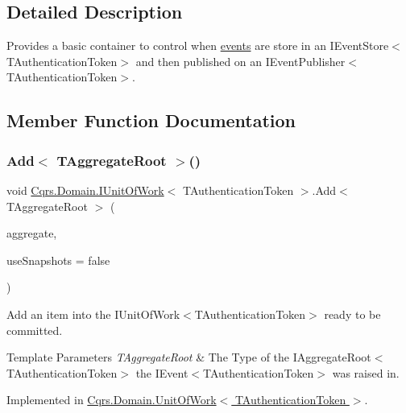 \subsection{Detailed Description}
Provides a basic container to control when \hyperlink{}{events} are store in an I\+Event\+Store$<$\+T\+Authentication\+Token$>$ and then published on an I\+Event\+Publisher$<$\+T\+Authentication\+Token$>$. 



\subsection{Member Function Documentation}
\mbox{\label{interfaceCqrs_1_1Domain_1_1IUnitOfWork_a1899165061529d5c9e77429b1fa72189_a1899165061529d5c9e77429b1fa72189}} 
\subsubsection{\texorpdfstring{Add$<$ T\+Aggregate\+Root $>$()}{Add< TAggregateRoot >()}}
{\footnotesize\ttfamily void \hyperlink{interfaceCqrs_1_1Domain_1_1IUnitOfWork}{Cqrs.\+Domain.\+I\+Unit\+Of\+Work}$<$ T\+Authentication\+Token $>$.Add$<$ T\+Aggregate\+Root $>$ (\begin{DoxyParamCaption}\item[{T\+Aggregate\+Root}]{aggregate,  }\item[{bool}]{use\+Snapshots = {\ttfamily false} }\end{DoxyParamCaption})}



Add an item into the I\+Unit\+Of\+Work$<$\+T\+Authentication\+Token$>$ ready to be committed. 


\begin{DoxyTemplParams}{Template Parameters}
{\em T\+Aggregate\+Root} & The Type of the I\+Aggregate\+Root$<$\+T\+Authentication\+Token$>$ the I\+Event$<$\+T\+Authentication\+Token$>$ was raised in.\\
\hline
\end{DoxyTemplParams}


Implemented in \hyperlink{classCqrs_1_1Domain_1_1UnitOfWork_a91bd702e09fb175e7b6bb4ee2a66bb61_a91bd702e09fb175e7b6bb4ee2a66bb61}{Cqrs.\+Domain.\+Unit\+Of\+Work$<$ T\+Authentication\+Token $>$}.

